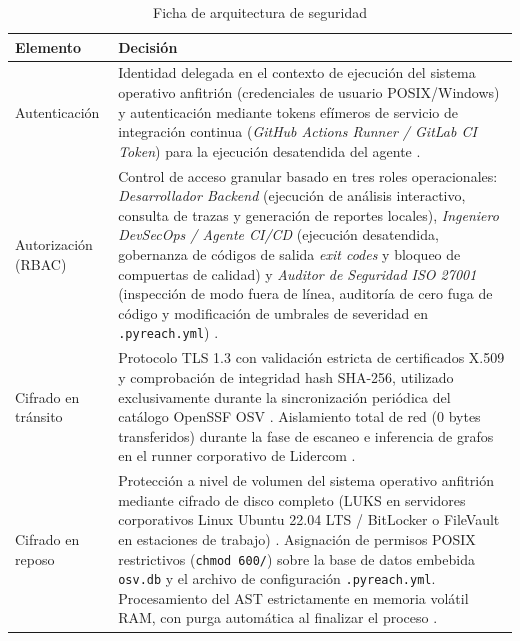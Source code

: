 \begin{table}[H]
\centering
\caption{Ficha de arquitectura de seguridad}
\label{p5:tab:ficha_seguridad}
\small
{}
\begin{tabularx}{\textwidth}{p{4.2cm} X}
\toprule
\textbf{Elemento} & \textbf{Decisión} \\
\midrule
Autenticación & 
Identidad delegada en el contexto de ejecución del sistema operativo anfitrión (credenciales de usuario POSIX/Windows) y autenticación mediante tokens efímeros de servicio de integración continua (\textit{GitHub Actions Runner / GitLab CI Token}) para la ejecución desatendida del agente \cite{humble2010continuous}. \\
\addlinespace
Autorización (RBAC) & 
Control de acceso granular basado en tres roles operacionales: \textit{Desarrollador Backend} (ejecución de análisis interactivo, consulta de trazas y generación de reportes locales), \textit{Ingeniero DevSecOps / Agente CI/CD} (ejecución desatendida, gobernanza de códigos de salida \textit{exit codes} y bloqueo de compuertas de calidad) y \textit{Auditor de Seguridad ISO 27001} (inspección de modo fuera de línea, auditoría de cero fuga de código y modificación de umbrales de severidad en \texttt{.\allowbreak pyreach.\allowbreak yml}) \cite{torres2026proyecto}. \\
\addlinespace
Cifrado en tránsito & 
Protocolo TLS 1.3 con validación estricta de certificados X.509 y comprobación de integridad hash SHA-256, utilizado exclusivamente durante la sincronización periódica del catálogo OpenSSF OSV \cite{openssf2023osv}. Aislamiento total de red (0 bytes transferidos) durante la fase de escaneo e inferencia de grafos en el runner corporativo de Lidercom \cite{ladisa2023sok}. \\
\addlinespace
Cifrado en reposo & 
Protección a nivel de volumen del sistema operativo anfitrión mediante cifrado de disco completo (LUKS en servidores corporativos Linux Ubuntu 22.04 LTS / BitLocker o FileVault en estaciones de trabajo) \cite{gutierrez2024auditoria}. Asignación de permisos POSIX restrictivos (\texttt{chmod 600/\allowbreak 640}) sobre la base de datos embebida \texttt{osv.\allowbreak db} y el archivo de configuración \texttt{.\allowbreak pyreach.\allowbreak yml}. Procesamiento del AST estrictamente en memoria volátil RAM, con purga automática al finalizar el proceso \cite{salis2021pycg}. \\
\bottomrule
\end{tabularx}
\end{table}

